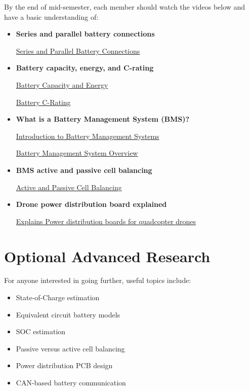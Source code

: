 \documentclass{article}
\begin{document}
By the end of mid-semester, each member should watch the videos below and have a basic understanding of:

\begin{itemize}

    \item \textbf{Series and parallel battery connections}

    \href{https://www.youtube.com/watch?v=L-UfAeyTI9g}
    {Series and Parallel Battery Connections}

    \item \textbf{Battery capacity, energy, and C-rating}

    \href{https://www.youtube.com/watch?v=cxkVxi9P0EA}
    {Battery Capacity and Energy}

    \href{https://www.youtube.com/watch?v=5JZ8E7B4FAY}
    {Battery C-Rating}

    \item \textbf{What is a Battery Management System (BMS)?}

    \href{https://www.youtube.com/watch?v=q4wDa_m9-8E}
    {Introduction to Battery Management Systems}

    \href{https://www.youtube.com/watch?v=rT-1gvkFj60}
    {Battery Management System Overview}

    \item \textbf{BMS active and passive cell balancing}

    \href{https://www.youtube.com/watch?v=GXYJ1xC10j4}
    {Active and Passive Cell Balancing}

    \item \textbf{Drone power distribution board explained}

    \href{https://www.youtube.com/watch?v=CU4Tl4xxuh8}
    { Explains Power distribution boards for quadcopter drones}
\end{itemize}

\section{Optional Advanced Research}

For anyone interested in going further, useful topics include:

\begin{itemize}
\item State-of-Charge estimation

\item Equivalent circuit battery models

\item SOC estimation

\item Passive versus active cell balancing

\item Power distribution PCB design

\item CAN-based battery communication

\end{itemize}
\end{document}
